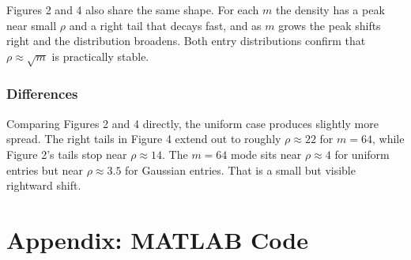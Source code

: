 \documentclass[11pt]{article}
\begin{document}
Figures 2 and 4 also share the same shape. For each $m$ the density has a peak near small $\rho$ and a right tail that decays fast, and as $m$ grows the peak shifts right and the distribution broadens. Both entry distributions confirm that $\rho \approx \sqrt{m}$ is practically stable.

\subsubsection*{Differences}
Comparing Figures 2 and 4 directly, the uniform case produces slightly more spread. The right tails in Figure 4 extend out to roughly $\rho \approx 22$ for $m = 64$, while Figure 2's tails stop near $\rho \approx 14$. The $m = 64$ mode sits near $\rho \approx 4$ for uniform entries but near $\rho \approx 3.5$ for Gaussian entries. That is a small but visible rightward shift. 

\newpage
\section*{Appendix: MATLAB Code}


\end{document}
